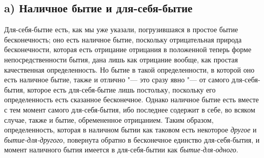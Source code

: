 \subsection[a) Наличное бытие и для-себя-бытие]{a) Наличное бытие и для-себя-бытие}
Для-себя-бытие есть, как мы уже указали, погрузившаяся в простое бытие
бесконечность; оно есть наличное бытие, поскольку отрицательная природа
бесконечности, которая есть отрицание отрицания в положенной теперь форме
непосредственности бытия, дана лишь как отрицание вообще, как простая
качественная определенность. Но бытие в такой определенности, в которой оно
есть наличное бытие, также и отлично "--- это сразу явно "--- от самого
для-себя-бытия, которое есть для-себя-бытие лишь постольку, поскольку его
определенность есть сказанное бесконечное. Однако наличное бытие есть
вместе с тем момент самого для-себя-бытия, ибо последнее содержит в себе,
во всяком случае, также и бытие, обремененное отрицанием. Таким образом,
определенность, которая в наличном бытии как таковом есть некоторое
{\em другое} и {\em бытие-для-другого}, повернута обратно в
бесконечное единство для-себя-бытия, и момент наличного бытия имеется в
для-себя-бытии как {\em бытие-для-одного}.

